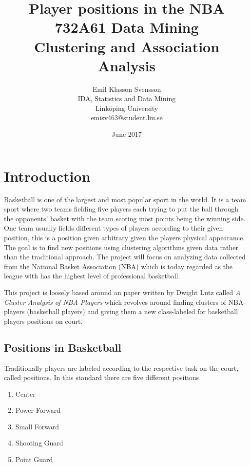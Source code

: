 \documentclass{article}
\title{Player positions in the NBA \\
\large  732A61 Data Mining \\
 Clustering and Association Analysis }
\author{Emil Klasson Svensson
 \\IDA, Statistics and Data Mining
\\Linköping University
\\emisv463@student.liu.se}
\date{June 2017}
\begin{document}
\maketitle
\thispagestyle{empty}
\newpage

\section{Introduction}

Basketball is one of the largest and most popular sport in the world. It is a team sport where two teams fielding five players each trying to put the ball through the opponents’ basket with the team scoring most points being the winning side. One team usually fields different types of players according to their given position, this is a position given arbitrary given the players physical appearance.\cite{wikibasket} The goal is to find new positions using clustering algorithms given data rather than the traditional approach. The project will focus on analyzing data collected from the National Basket Association (NBA) which is today regarded as the league with has the highest level of professional basketball.
 
This project is loosely based around an paper written by Dwight Lutz called \textit{A Cluster Analysis of NBA Players} \cite{lutz2012cluster} which revolves around finding clusters of NBA-players (basketball players) and giving them a new class-labeled for basketball players positions on court.




\subsection{Positions in Basketball}

Traditionally players are labeled according to the respective task on the court, called positions. In this standard there are five different positions

\begin{enumerate}
\item Center 
\item Power Forward
\item Small Forward
\item Shooting Guard
\item Point Guard
\end{enumerate}
\end{document}
